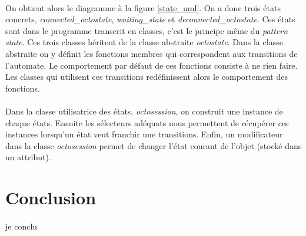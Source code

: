 \documentclass[a4paper]{article}
\begin{document}
			\paragraph{}{
			On obtient alors le diagramme à la figure \ref{state_uml}. On a donc trois états concrets, \textit{connected\_octostate}, \textit{waiting\_state} et \textit{deconnected\_octostate}.
			Ces états sont dans le programme transcrit en classes, c'est le principe même du \textit{pattern
			state}. Ces trois classes héritent de la classe abstraite \textit{octostate}.
			Dans la classe abstraite on y définit les fonctions membres qui correspondent aux transitions de l'automate.
			Le comportement par défaut de ces fonctions consiste à ne rien faire. Les classes qui utilisent ces transitions
			redéfinissent alors le comportement des fonctions.
			}
			\paragraph{}{
			Dans la classe utilisatrice des états, \textit{octosession}, on construit une instance de chaque états.
			Ensuite les sélecteurs adéquats nous permettent de récupérer ces instances lorsqu'un état veut franchir 
			une transitions. \newline
			Enfin, un modificateur dans la classe \textit{octosession} permet de changer l'état courant de l'objet 
			(stocké dans un attribut). 
			}
	\newpage

	\section*{Conclusion}
		\paragraph{}{je conclu}
\end{document}
